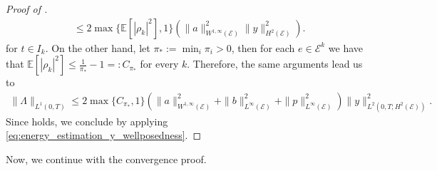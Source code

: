 \documentclass[10pt,a4paper]{amsart}
\begin{document}
\begin{proof}[Proof of ]
\begin{align*}
    &\leq 2\max\{\mathbb{E}[|\rho_k|^2],1\}\left( \|a\|_{W^{1,\infty}(\mathcal{E})}^2\|y \|_{H^2(\mathcal{E})}^2\right).
\end{align*}
 for $t\in I_k$. On the other hand, let $\pi_\ast:=\min_i\pi_i>0$, then for each $e\in \mathcal{E}^k$ we have that $\mathbb{E}[|\rho_k|^2]\leq \frac{1}{\pi_\ast}-1 =:C_{\pi_\ast}$ for every $k$. Therefore, the same arguments lead us to
\begin{align*}
    \|\Lambda\|_{L^1(0,T)}\leq  2\max\{C_{\pi_\ast},1\}\left(\|a\|_{W^{1,\infty}(\mathcal{E})}^2+\|b\|_{L^{\infty}(\mathcal{E})}^2+\|p\|_{L^{\infty}(\mathcal{E})}^2\right)\|y\|^2_{L^2(0,T;H^2(\mathcal{E}))}.
\end{align*}
Since  holds, we conclude by applying \eqref{eq:energy_estimation_y_wellposedness}.
\end{proof}
Now, we continue with the convergence proof. 
\end{document}
